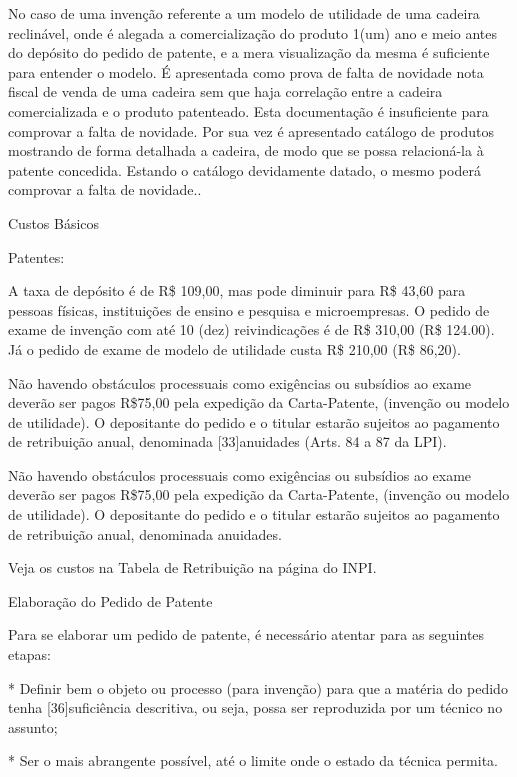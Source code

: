 \documentclass[12pt]{article}
\begin{document}
     No caso de uma invenção referente a um modelo de utilidade de uma
     cadeira reclinável, onde é alegada a comercialização do produto
     1(um) ano e meio antes do depósito do pedido de patente, e a mera
     visualização da mesma é suficiente para entender o modelo. É
     apresentada como prova de falta de novidade nota fiscal de venda
     de uma cadeira sem que haja correlação entre a cadeira
     comercializada e o produto patenteado. Esta documentação é
     insuficiente para comprovar a falta de novidade. Por sua vez é
     apresentado catálogo de produtos mostrando de forma detalhada a
     cadeira, de modo que se possa relacioná-la à patente concedida.
     Estando o catálogo devidamente datado, o mesmo poderá comprovar a
     falta de novidade..


 Custos Básicos

 Patentes:
 
 A taxa de depósito é de R\$ 109,00, mas pode diminuir para R\$ 43,60
 para pessoas físicas, instituições de ensino e pesquisa e
 microempresas. O pedido de exame de invenção com até 10 (dez)
 reivindicações é de R\$ 310,00 (R\$ 124.00). Já o pedido de exame de
 modelo de utilidade custa R\$ 210,00 (R\$ 86,20).
 
 Não havendo obstáculos processuais como exigências ou subsídios ao
 exame deverão ser pagos R\$75,00 pela expedição da Carta-Patente,
 (invenção ou modelo de utilidade). O depositante do pedido e o
 titular estarão sujeitos ao pagamento de retribuição anual,
 denominada [33]anuidades (Arts. 84 a 87 da LPI).
 
 Não havendo obstáculos processuais como exigências ou subsídios ao
 exame deverão ser pagos R\$75,00 pela expedição da Carta-Patente,
 (invenção ou modelo de utilidade). O depositante do pedido e o
 titular estarão sujeitos ao pagamento de retribuição anual,
 denominada anuidades.
 
 Veja os custos na Tabela de Retribuição na página do INPI.



 Elaboração do Pedido de Patente
 
 Para se elaborar um pedido de patente, é necessário atentar para as
 seguintes etapas:
 
 * Definir bem o objeto ou processo (para invenção) para que a matéria
 do pedido tenha [36]suficiência descritiva, ou seja, possa ser
 reproduzida por um técnico no assunto;
 
 * Ser o mais abrangente possível, até o limite onde o estado da
 técnica permita.
 
\end{document}
